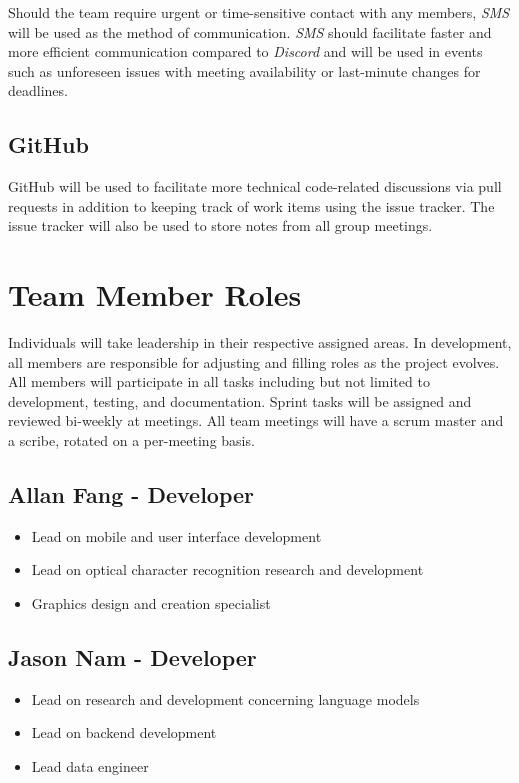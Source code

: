 \documentclass{article}
\begin{document}
Should the team require urgent or time-sensitive contact with any members, \emph{SMS} will be used as the method
of communication. \emph{SMS} should facilitate faster and more efficient communication compared to \emph{Discord}
and will be used in events such as unforeseen issues with meeting availability or last-minute changes for deadlines.

\subsection{GitHub}

GitHub will be used to facilitate more technical code-related discussions via pull requests in addition to
keeping track of work items using the issue tracker. The issue tracker will also be used to store notes from
all group meetings.

\section{Team Member Roles}
Individuals will take leadership in their respective assigned areas. In development, all members are responsible for adjusting and filling roles as the project evolves. All members will participate in all tasks including but not limited to development, testing, and documentation. Sprint tasks will be assigned and reviewed bi-weekly at meetings. All team meetings will have a scrum master and a scribe, rotated on a per-meeting basis.
	\subsection{Allan Fang - Developer}
        \begin{itemize}
            \item Lead on mobile and user interface development
            \item Lead on optical character recognition research and development
            \item Graphics design and creation specialist
        \end{itemize}
    \subsection{Jason Nam - Developer}
        \begin{itemize}
            \item Lead on research and development concerning language models
            \item Lead on backend development
            \item Lead data engineer
        \end{itemize}
\end{document}
